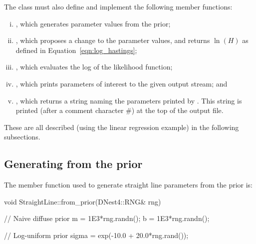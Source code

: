 \documentclass[article]{jss}
\begin{document}
The class must also define and implement the following member functions:
\begin{enumerate}[(i)]
\item {}, which generates parameter
        values from the prior;
\item {}, which proposes a
        change to the parameter values, and returns $\ln(H)$ as defined in
        Equation~\ref{eqn:log_hastings};
\item {}, which evaluates the log of
        the likelihood function;
\item {}, which prints parameters of
        interest to the given output stream; and
\item {}, which returns a 
        string naming the parameters printed by .
        This string is printed (after a comment character \#) at the top of
        the output file.
\end{enumerate}
These are all described (using the linear regression example) in the
following subsections.





\subsection{Generating from the prior}
The member function used to generate straight line parameters from the
prior is:
\begin{CodeChunk}
\begin{CodeInput}
void StraightLine::from_prior(DNest4::RNG& rng)
{
   // Naive diffuse prior
   m = 1E3*rng.randn();
   b = 1E3*rng.randn();

   // Log-uniform prior
   sigma = exp(-10.0 + 20.0*rng.rand());
}
\end{CodeInput}
\end{CodeChunk}
\end{document}
